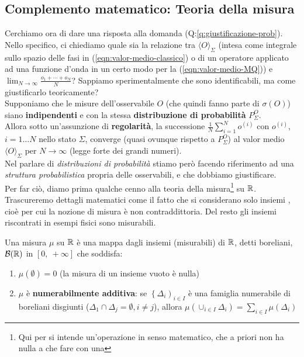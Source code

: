 \documentclass[FisicaTeorica.tex]{subfiles}
\begin{document}
\subsection{Complemento matematico: Teoria della misura}
Cerchiamo ora di dare una risposta alla domanda (Q:\ref{q:giustificazione-prob}). Nello specifico, ci chiediamo quale sia la relazione tra $\langle O \rangle_\Sigma$ (intesa come integrale sullo spazio delle fasi in \textit{\MC} (\ref{eqn:valor-medio-classico}) o di un operatore applicato ad una funzione d'onda in un certo modo per la \textit{\MQ} (\ref{eqn:valor-medio-MQ})) e $\lim_{N\to\infty} \frac{o_1 + \cdots + o_N}{N}$? Sappiamo sperimentalmente che sono identificabili, ma come giustificarlo teoricamente?\\
Supponiamo che le misure dell'osservabile $O$ (che quindi fanno parte di $\sigma(O)$) siano \textbf{indipendenti} e con la stessa \textbf{distribuzione di probabilità} $P_\Sigma^O$.\\
Allora sotto un'assunzione di \textbf{regolarità}, la successione $\frac{1}{N}\sum_{i=1}^{N}o^{\left(i\right)}$ con $o^{(i)}$, $i=1\dots N$ nello stato $\Sigma$, converge (quasi ovunque rispetto a $P_\Sigma^O$) al valor medio $\langle O \rangle_\Sigma$  per $N\to\infty$ (legge forte dei grandi numeri).\\
Nel parlare di \textit{distribuzioni di probabilità} stiamo però facendo riferimento ad una \textit{struttura probabilistica} propria delle osservabili, e che dobbiamo giustificare.\\
Per far ciò, diamo prima qualche cenno alla teoria della misura\footnote{Qui per  si intende un'operazione in senso matematico, che a priori non ha nulla a che fare con una } su $\mathbb{R}$.\\
Trascureremo dettagli matematici come il fatto che si considerano solo insiemi , cioè per cui la nozione di misura è non contraddittoria. Del resto  gli insiemi riscontrati in esempi fisici sono misurabili.\\
\begin{dfn}
Una misura $\mu$ su $\mathbb{R}$ è una mappa dagli insiemi (misurabili) di $\mathbb{R}$, detti boreliani, $\mathcal{B}(\mathbb{R})$ in $\left[0,\ +\infty\right]$ che soddisfa:
\begin{enumerate}
    \item $\mu \left(\emptyset\right)=0$ (la misura di un insieme vuoto è nulla)
    \item $\mu$ è \textbf{numerabilmente additiva}: se $\left\{\Delta_i\right)_{i\in I}$ è una famiglia numerabile di boreliani disgiunti ($\Delta_1 \cap \Delta_j=\emptyset, i\neq j$), allora $\mu\left(\cup_{i\in I}\Delta_i\right)= \sum_{i\in I}\mu\left(\Delta_i\right)$
\end{enumerate}
\end{dfn}
\end{document}
